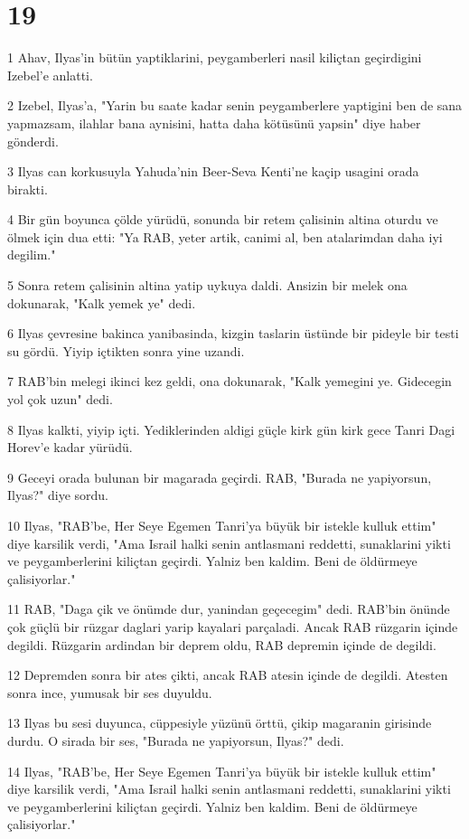 \chapter{19}

\par 1 Ahav, Ilyas'in bütün yaptiklarini, peygamberleri nasil kiliçtan geçirdigini Izebel'e anlatti.
\par 2 Izebel, Ilyas'a, "Yarin bu saate kadar senin peygamberlere yaptigini ben de sana yapmazsam, ilahlar bana aynisini, hatta daha kötüsünü yapsin" diye haber gönderdi.
\par 3 Ilyas can korkusuyla Yahuda'nin Beer-Seva Kenti'ne kaçip usagini orada birakti.
\par 4 Bir gün boyunca çölde yürüdü, sonunda bir retem çalisinin altina oturdu ve ölmek için dua etti: "Ya RAB, yeter artik, canimi al, ben atalarimdan daha iyi degilim."
\par 5 Sonra retem çalisinin altina yatip uykuya daldi. Ansizin bir melek ona dokunarak, "Kalk yemek ye" dedi.
\par 6 Ilyas çevresine bakinca yanibasinda, kizgin taslarin üstünde bir pideyle bir testi su gördü. Yiyip içtikten sonra yine uzandi.
\par 7 RAB'bin melegi ikinci kez geldi, ona dokunarak, "Kalk yemegini ye. Gidecegin yol çok uzun" dedi.
\par 8 Ilyas kalkti, yiyip içti. Yediklerinden aldigi güçle kirk gün kirk gece Tanri Dagi Horev'e kadar yürüdü.
\par 9 Geceyi orada bulunan bir magarada geçirdi. RAB, "Burada ne yapiyorsun, Ilyas?" diye sordu.
\par 10 Ilyas, "RAB'be, Her Seye Egemen Tanri'ya büyük bir istekle kulluk ettim" diye karsilik verdi, "Ama Israil halki senin antlasmani reddetti, sunaklarini yikti ve peygamberlerini kiliçtan geçirdi. Yalniz ben kaldim. Beni de öldürmeye çalisiyorlar."
\par 11 RAB, "Daga çik ve önümde dur, yanindan geçecegim" dedi. RAB'bin önünde çok güçlü bir rüzgar daglari yarip kayalari parçaladi. Ancak RAB rüzgarin içinde degildi. Rüzgarin ardindan bir deprem oldu, RAB depremin içinde de degildi.
\par 12 Depremden sonra bir ates çikti, ancak RAB atesin içinde de degildi. Atesten sonra ince, yumusak bir ses duyuldu.
\par 13 Ilyas bu sesi duyunca, cüppesiyle yüzünü örttü, çikip magaranin girisinde durdu. O sirada bir ses, "Burada ne yapiyorsun, Ilyas?" dedi.
\par 14 Ilyas, "RAB'be, Her Seye Egemen Tanri'ya büyük bir istekle kulluk ettim" diye karsilik verdi, "Ama Israil halki senin antlasmani reddetti, sunaklarini yikti ve peygamberlerini kiliçtan geçirdi. Yalniz ben kaldim. Beni de öldürmeye çalisiyorlar."
